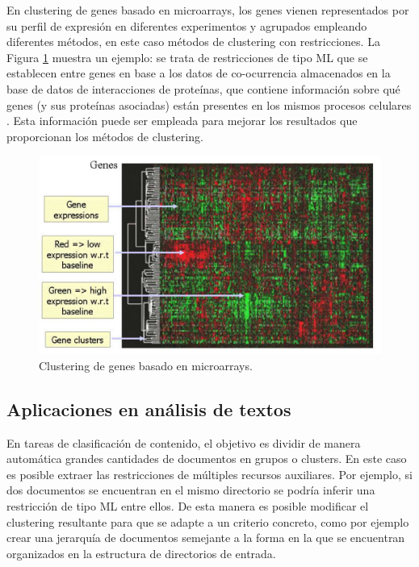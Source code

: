 En clustering de genes basado en microarrays, los genes vienen representados por su perfil de expresión en diferentes experimentos y agrupados empleando diferentes métodos, en este caso métodos de clustering con restricciones. La  Figura \ref{fig:figure13} muestra un ejemplo: se trata de restricciones de tipo \acf{ML} que se establecen entre genes en base a los datos de co-ocurrencia almacenados en la base de datos de interacciones de proteínas, que contiene información sobre qué genes (y sus proteínas asociadas) están presentes en los mismos procesos celulares \cite{Xenarios:2001}. Esta información puede ser empleada para mejorar los resultados que proporcionan los métodos de clustering. \cite{Seagal:2003}

\begin{figure}[!h]
	\centering
	\includegraphics[scale=0.3]{imagenes/c3/Genetica/Genes} 
	\caption[Clustering de genes basado en microarrays.]{Clustering de genes basado en microarrays. \cite{Survey:2007}}\label{fig:figure13}
\end{figure}

\subsection{Aplicaciones en análisis de textos}

En tareas de clasificación de contenido, el objetivo es dividir de manera automática grandes cantidades de documentos en grupos o clusters. En este caso es posible extraer las restricciones de múltiples recursos auxiliares. Por ejemplo, si dos documentos se encuentran en el mismo directorio se podría inferir una restricción de tipo \acf{ML} entre ellos. De esta manera es posible modificar el clustering resultante para que se adapte a un criterio concreto, como por ejemplo crear una jerarquía de documentos semejante a la forma en la que se encuentran organizados en la estructura de directorios de entrada.

